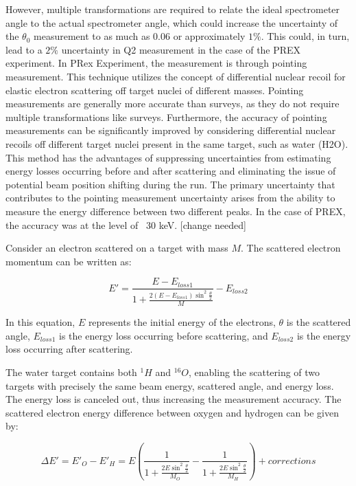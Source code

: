 However, multiple transformations are required to relate the ideal spectrometer angle to the actual spectrometer angle, which could increase the uncertainty of the $\theta_0$ measurement to as much as 0.06 or approximately $1\%$. This could, in turn, lead to a $2\%$ uncertainty in Q2 measurement in the case of the PREX experiment. In PRex Experiment, the measurement is through pointing measurement. This technique utilizes the concept of differential nuclear recoil for elastic electron scattering off target nuclei of different masses. Pointing measurements are generally more accurate than surveys, as they do not require multiple transformations like surveys. Furthermore, the accuracy of pointing measurements can be significantly improved by considering differential nuclear recoils off different target nuclei present in the same target, such as water (H2O). This method has the advantages of suppressing uncertainties from estimating energy losses occurring before and after scattering and eliminating the issue of potential beam position shifting during the run. The primary uncertainty that contributes to the pointing measurement uncertainty arises from the ability to measure the energy difference between two different peaks. In the case of PREX, the accuracy was at the level of ~30 keV. [change needed]

Consider an electron scattered on a target with mass $M$. The scattered electron momentum can be written as:

\begin{equation}
E' = \frac{E - E_{loss1}}{1 + \frac{2(E-E_{loss1})\sin^2{\frac{\theta}{2}}}{M}} - E_{loss2}
\end{equation}

In this equation, $E$ represents the initial energy of the electrons, $\theta$ is the scattered angle, $E_{loss1}$ is the energy loss occurring before scattering, and $E_{loss2}$ is the energy loss occurring after scattering.

The water target contains both $^{1}H$ and $^{16}O$, enabling the scattering of two targets with precisely the same beam energy, scattered angle, and energy loss. The energy loss is canceled out, thus increasing the measurement accuracy. The scattered electron energy difference between oxygen and hydrogen can be given by:

\begin{equation}
\Delta{E'} = E'_O - E'_H = E (\frac{1}{1 + \frac{2E\sin^2{\frac{\theta}{2}}}{M_O}} - \frac{1}{1 + \frac{2E\sin^2{\frac{\theta}{2}}}{M_H}}) + corrections
\end{equation}

